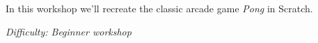 %
%
%

\newif\ifprint
\printfalse



\newcommand{\workshopTitle}{Workshop 18: Games with Scratch}

\newcommand{\workshopAuthor}{Jack Kelly}



	
	
	In this workshop we'll recreate the classic arcade game \textit{Pong} in Scratch.
	
	\textit{Difficulty: Beginner workshop}

	\ifprint
		\renewcommand{\baselinestretch}{0.75}\normalsize
		\tableofcontents
		\renewcommand{\baselinestretch}{1.0}\normalsize
	\else
		\tableofcontents
	\fi
	
	
	
		\pagebreak[3]
		
		
	
	
